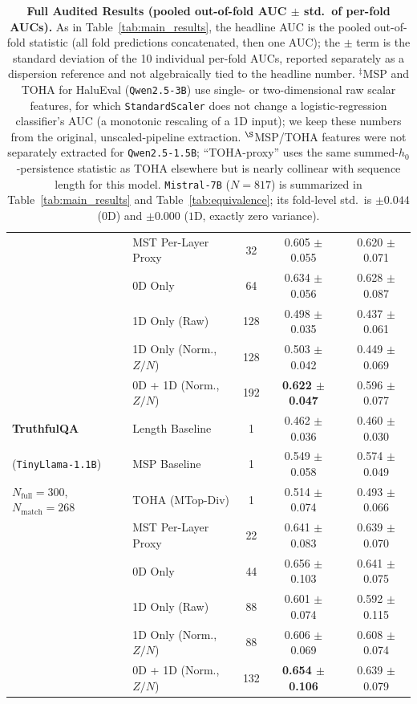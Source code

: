 \documentclass{article}
\begin{document}
\begin{table}[ht]
{\begin{tabular}{llccc}
 & MST Per-Layer Proxy & 32 & 0.605 $\pm$ 0.055 & 0.620 $\pm$ 0.071 \\
 & 0D Only & 64 & 0.634 $\pm$ 0.056 & 0.628 $\pm$ 0.087 \\
 & 1D Only (Raw) & 128 & 0.498 $\pm$ 0.035 & 0.437 $\pm$ 0.061 \\
 & 1D Only (Norm., $Z/N$) & 128 & 0.503 $\pm$ 0.042 & 0.449 $\pm$ 0.069 \\
 & 0D + 1D (Norm., $Z/N$) & 192 & \textbf{0.622 $\pm$ 0.047} & 0.596 $\pm$ 0.077 \\
\midrule
\textbf{TruthfulQA} & Length Baseline & 1 & 0.462 $\pm$ 0.036 & 0.460 $\pm$ 0.030 \\
(\texttt{TinyLlama-1.1B}) & MSP Baseline & 1 & 0.549 $\pm$ 0.058 & 0.574 $\pm$ 0.049 \\
$N_{\text{full}}{=}300$, $N_{\text{match}}{=}268$ & TOHA (MTop-Div) & 1 & 0.514 $\pm$ 0.074 & 0.493 $\pm$ 0.066 \\
 & MST Per-Layer Proxy & 22 & 0.641 $\pm$ 0.083 & 0.639 $\pm$ 0.070 \\
 & 0D Only & 44 & 0.656 $\pm$ 0.103 & 0.641 $\pm$ 0.075 \\
 & 1D Only (Raw) & 88 & 0.601 $\pm$ 0.074 & 0.592 $\pm$ 0.115 \\
 & 1D Only (Norm., $Z/N$) & 88 & 0.606 $\pm$ 0.069 & 0.608 $\pm$ 0.074 \\
 & 0D + 1D (Norm., $Z/N$) & 132 & \textbf{0.654 $\pm$ 0.106} & 0.639 $\pm$ 0.079 \\
\bottomrule
\end{tabular}%
}
\caption{\textbf{Full Audited Results (pooled out-of-fold AUC $\pm$ std.\ of per-fold AUCs).} As in Table~\ref{tab:main_results}, the headline AUC is the pooled out-of-fold statistic (all fold predictions concatenated, then one AUC); the $\pm$ term is the standard deviation of the 10 individual per-fold AUCs, reported separately as a dispersion reference and not algebraically tied to the headline number. $^\ddagger$MSP and TOHA for HaluEval (\texttt{Qwen2.5-3B}) use single- or two-dimensional raw scalar features, for which \texttt{StandardScaler} does not change a logistic-regression classifier's AUC (a monotonic rescaling of a 1D input); we keep these numbers from the original, unscaled-pipeline extraction. $^\S$MSP/TOHA features were not separately extracted for \texttt{Qwen2.5-1.5B}; ``TOHA-proxy'' uses the same summed-$h_0$-persistence statistic as TOHA elsewhere but is nearly collinear with sequence length for this model. \texttt{Mistral-7B} ($N{=}817$) is summarized in Table~\ref{tab:main_results} and Table~\ref{tab:equivalence}; its fold-level std.\ is $\pm0.044$ ($0$D) and $\pm0.000$ ($1$D, exactly zero variance).}
\label{tab:main_results_full}
\end{table}
\end{document}
